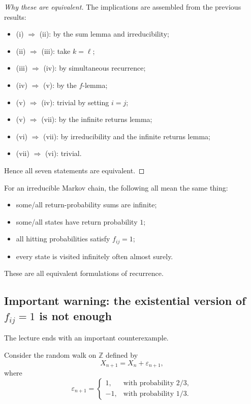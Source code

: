 \documentclass[11pt]{article}
\theoremstyle{definition}
\begin{document}
\begin{proof}[Why these are equivalent]
The implications are assembled from the previous results:
\begin{itemize}[leftmargin=2em]
    \item (i) \(\Rightarrow\) (ii): by the sum lemma and irreducibility;
    \item (ii) \(\Rightarrow\) (iii): take \(k=\ell\);
    \item (iii) \(\Rightarrow\) (iv): by simultaneous recurrence;
    \item (iv) \(\Rightarrow\) (v): by the \(f\)-lemma;
    \item (v) \(\Rightarrow\) (iv): trivial by setting \(i=j\);
    \item (v) \(\Rightarrow\) (vii): by the infinite returns lemma;
    \item (vi) \(\Rightarrow\) (vii): by irreducibility and the infinite returns lemma;
    \item (vii) \(\Rightarrow\) (vi): trivial.
\end{itemize}
Hence all seven statements are equivalent.
\end{proof}

\begin{keyformula}
For an irreducible Markov chain, the following all mean the same thing:
\begin{itemize}[leftmargin=2em]
    \item some/all return-probability sums are infinite;
    \item some/all states have return probability \(1\);
    \item all hitting probabilities satisfy \(f_{ij}=1\);
    \item every state is visited infinitely often almost surely.
\end{itemize}
These are all equivalent formulations of recurrence.
\end{keyformula}

\subsection{Important warning: the existential version of \texorpdfstring{$f_{ij}=1$}{fij = 1} is not enough}

The lecture ends with an important counterexample.

Consider the random walk on \(\mathbb Z\) defined by
\[
X_{n+1}=X_n+\varepsilon_{n+1},
\]
where
\[
\varepsilon_{n+1}
=
\begin{cases}
1, & \text{with probability } 2/3,\\
-1, & \text{with probability } 1/3.
\end{cases}
\]
\end{document}
